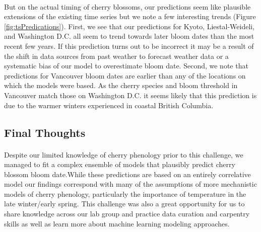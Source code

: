 \documentclass[a4paper,11pt]{article}
\begin{document}
\paragraph*{}
But on the actual timing of cherry blossoms, our predictions seem like plausible extensions of the existing time series but we note a few interesting trends (Figure \ref{fig:tsPredications}). First, we see that our predictions for Kyoto, Liestal-Weideli, and Washington D.C. all seem to trend towards later bloom dates than the most recent few years. If this prediction turns out to be incorrect it may be a result of the shift in data sources from past weather to forecast weather data or a systematic bias of our model to overestimate bloom date. Second, we note that predictions for Vancouver bloom dates are earlier than any of the locations on which the models were based. As the cherry species and bloom threshold in Vancouver match those on Washington D.C. it seems likely that this prediction is due to the warmer winters experienced in coastal British Columbia. 




\subsection{Final Thoughts}
\paragraph*{}
Despite our limited knowledge of cherry phenology prior to this challenge, we managed to fit a complex ensemble of models that plausibly predict cherry blossom bloom date.While these predictions are based on an entirely correlative model our findings correspond with many of the assumptions of more mechanistic models of cherry phenology, particularly the importance of temperature in the late winter/early spring. This challenge was also a great opportunity for us to share knowledge across our lab group and practice data curation and carpentry skills as well as learn more about machine learning modeling approaches.
\end{document}
